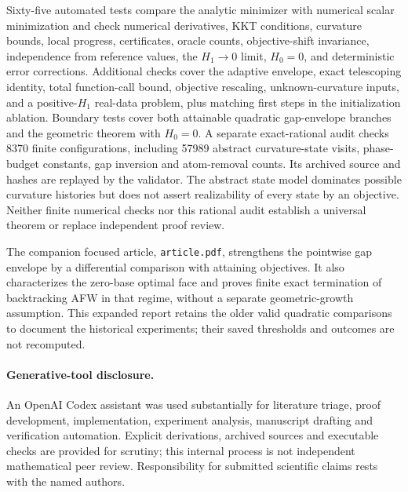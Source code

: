 \documentclass[11pt]{article}
\begin{document}
Sixty-five automated tests compare the analytic minimizer with numerical
scalar minimization and check numerical derivatives, KKT conditions,
curvature bounds, local progress, certificates, oracle counts,
objective-shift invariance, independence from reference values, the
$H_1\to0$ limit, $H_0=0$, and deterministic error corrections.
Additional checks cover the adaptive envelope, exact telescoping identity,
total function-call bound, objective rescaling, unknown-curvature inputs,
and a positive-$H_1$ real-data problem, plus matching first steps in the
initialization ablation. Boundary tests cover both attainable quadratic
gap-envelope branches and the geometric theorem with $H_0=0$.
A separate exact-rational audit checks 8370 finite configurations,
including 57989 abstract curvature-state visits, phase-budget constants,
gap inversion and atom-removal counts. Its archived source and hashes
are replayed by the validator. The abstract state model dominates
possible curvature histories but does not assert realizability of
every state by an objective. Neither finite numerical checks nor this
rational audit establish a universal theorem or replace independent
proof review.

The companion focused article, \texttt{article.pdf}, strengthens the
pointwise gap envelope by a differential comparison with attaining
objectives. It also characterizes the zero-base optimal face and proves
finite exact termination of backtracking AFW in that regime, without
a separate geometric-growth assumption. This expanded report retains
the older valid quadratic comparisons to document the historical
experiments; their saved thresholds and outcomes are not recomputed.

\paragraph{Generative-tool disclosure.}
An OpenAI Codex assistant was used substantially for literature triage,
proof development, implementation, experiment analysis, manuscript
drafting and verification automation. Explicit derivations, archived
sources and executable checks are provided for scrutiny; this internal
process is not independent mathematical peer review. Responsibility for
submitted scientific claims rests with the named authors.










\end{document}
